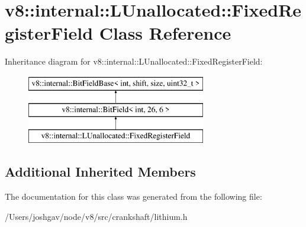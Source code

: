 \hypertarget{classv8_1_1internal_1_1_l_unallocated_1_1_fixed_register_field}{}\section{v8\+:\+:internal\+:\+:L\+Unallocated\+:\+:Fixed\+Register\+Field Class Reference}
\label{classv8_1_1internal_1_1_l_unallocated_1_1_fixed_register_field}
Inheritance diagram for v8\+:\+:internal\+:\+:L\+Unallocated\+:\+:Fixed\+Register\+Field\+:\begin{figure}[H]
\begin{center}
\leavevmode
\includegraphics[height=3.000000cm]{classv8_1_1internal_1_1_l_unallocated_1_1_fixed_register_field}
\end{center}
\end{figure}
\subsection*{Additional Inherited Members}


The documentation for this class was generated from the following file\+:\begin{DoxyCompactItemize}
\item 
/\+Users/joshgav/node/v8/src/crankshaft/lithium.\+h\end{DoxyCompactItemize}
